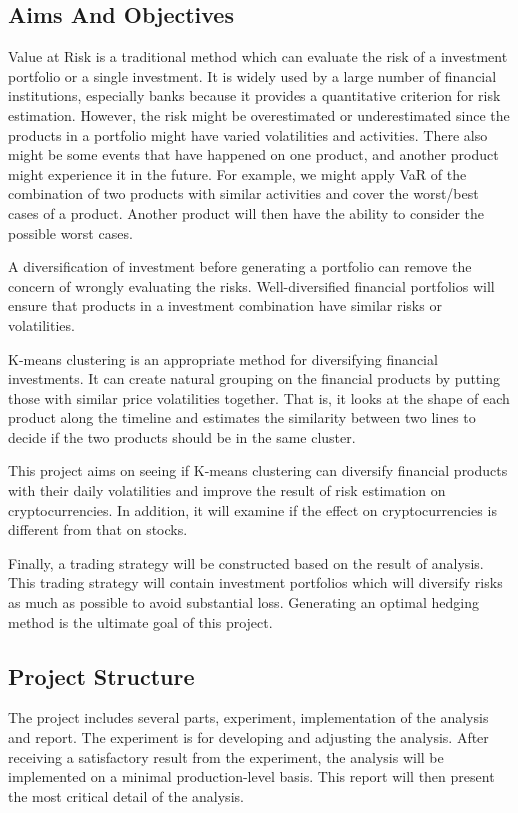\documentclass[11pt]{article} %
\theoremstyle{plain}
\theoremstyle{definition}
\begin{document}
\subsection{Aims And Objectives}

Value at Risk is a traditional method which can evaluate the risk of a investment portfolio or a single investment. It is widely used by a large number of financial institutions, especially banks because it provides a quantitative criterion for risk estimation. However, the risk might be overestimated or underestimated since the products in a portfolio might have varied volatilities and activities. There also might be some events that have happened on one product, and another product might experience it in the future. For example, we might apply VaR of the combination of two products with similar activities and cover the worst/best cases of a product. Another product will then have the ability to consider the possible worst cases.

A diversification of investment before generating a portfolio can remove the concern of wrongly evaluating the risks. Well-diversified financial portfolios will ensure that products in a investment combination have similar risks or volatilities.

K-means clustering is an appropriate method for diversifying financial investments. It can create natural grouping on the financial products by putting those with similar price volatilities together. That is, it looks at the shape of each product along the timeline and estimates the similarity between two lines to decide if the two products should be in the same cluster.

This project aims on seeing if K-means clustering can diversify financial products with their daily volatilities and improve the result of risk estimation on cryptocurrencies. In addition, it will examine if the effect on cryptocurrencies is different from that on stocks.

Finally, a trading strategy will be constructed based on the result of analysis. This trading strategy will contain investment portfolios which will diversify risks as much as possible to avoid substantial loss. Generating an optimal hedging method is the ultimate goal of this project.

\subsection{Project Structure}

The project includes several parts, experiment, implementation of the analysis and report. The experiment is for developing and adjusting the analysis. After receiving a satisfactory result from the experiment, the analysis will be implemented on a minimal production-level basis. This report will then present the most critical detail of the analysis.
\end{document}

